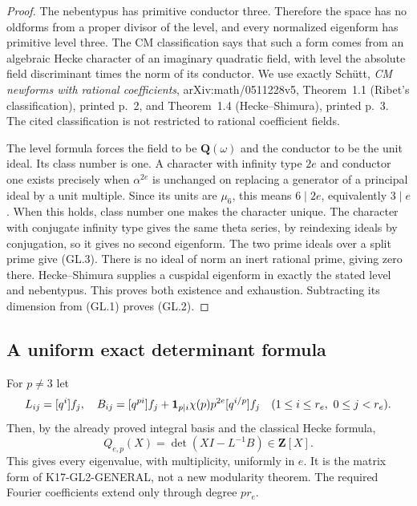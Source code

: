\documentclass[11pt,a4paper]{article}
\theoremstyle{definition}
\begin{document}
\begin{proof}
The nebentypus has primitive conductor three. Therefore the space
has no oldforms from a proper divisor of the level, and every
normalized eigenform has primitive level three.
The CM classification says that such a form comes from an
algebraic Hecke character of an imaginary quadratic field, with
level the absolute field discriminant times the norm of its
conductor. We use exactly Sch\"utt,
\emph{CM newforms with rational coefficients},
arXiv:math/0511228v5, Theorem~1.1 (Ribet's classification),
printed p.~2, and Theorem~1.4 (Hecke--Shimura),
printed p.~3. The cited classification is not restricted to
rational coefficient fields.

The level formula forces the field to be $\mathbf Q(\omega)$
and the conductor to be the unit ideal. Its class number is one.
A character with infinity type $2e$ and conductor one exists
precisely when $\alpha^{2e}$ is unchanged on replacing a generator
of a principal ideal by a unit multiple. Since its units are
$\mu_6$, this means $6\mid2e$, equivalently $3\mid e$.
When this holds, class number one makes the character unique.
The character with conjugate infinity type gives the same theta
series, by reindexing ideals by conjugation, so it gives no second
eigenform. The two prime ideals over a split prime give (GL.3).
There is no ideal of norm an inert rational prime, giving zero
there. Hecke--Shimura supplies a cuspidal eigenform in exactly
the stated level and nebentypus. This proves both existence and
exhaustion. Subtracting its dimension from (GL.1) proves (GL.2).
\end{proof}

\subsection{A uniform exact determinant formula}

For $p\ne3$ let
\[
 L_{ij}=[q^i]f_j,\quad
 B_{ij}=[q^{pi}]f_j+
       {\bf1}_{p\mid i}\chi(p)p^{2e}[q^{i/p}]f_j
 \quad(1\leq i\leq r_e,\ 0\leq j<r_e).
\]
Then, by the already proved integral basis and the classical
Hecke formula,
\[
       Q_{e,p}(X)=\det(XI-L^{-1}B)\in\mathbf Z[X].
 \tag{GL.4}
\]
This gives every eigenvalue, with multiplicity, uniformly in $e$.
It is the matrix form of K17-GL2-GENERAL, not a new modularity
theorem. The required Fourier coefficients extend only through
degree $pr_e$.
\end{document}
